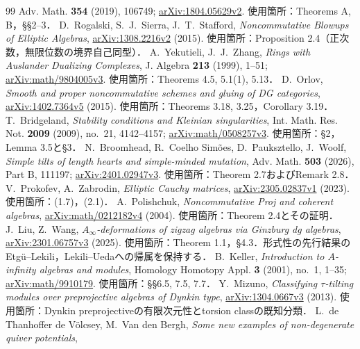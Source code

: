 \documentclass[11pt,a4paper]{ltjsarticle}
\theoremstyle{definition}
\begin{document}
\begin{thebibliography}{99}
Adv. Math. \textbf{354} (2019), 106749;
\href{https://arxiv.org/abs/1804.05629}{arXiv:1804.05629v2}.
使用箇所：Theorems A, B，\S\S2--3．
D.~Rogalski, S.~J.~Sierra, J.~T.~Stafford, \emph{Noncommutative Blowups of Elliptic Algebras},
\href{https://arxiv.org/abs/1308.2216}{arXiv:1308.2216v2} (2015).
使用箇所：Proposition 2.4（正次数，無限位数の境界自己同型）．
A.~Yekutieli, J.~J.~Zhang, \emph{Rings with Auslander Dualizing Complexes},
J. Algebra \textbf{213} (1999), 1--51;
\href{https://arxiv.org/abs/math/9804005}{arXiv:math/9804005v3}.
使用箇所：Theorems 4.5, 5.1(1), 5.13．
D.~Orlov, \emph{Smooth and proper noncommutative schemes and gluing of DG categories},
\href{https://arxiv.org/abs/1402.7364}{arXiv:1402.7364v5} (2015).
使用箇所：Theorems 3.18, 3.25，Corollary 3.19．
T.~Bridgeland, \emph{Stability conditions and Kleinian singularities},
Int. Math. Res. Not. \textbf{2009} (2009), no.~21, 4142--4157;
\href{https://arxiv.org/abs/math/0508257}{arXiv:math/0508257v3}.
使用箇所：\S2，Lemma 3.5と\S3．
N.~Broomhead, R.~Coelho Sim\~oes, D.~Pauksztello, J.~Woolf,
\emph{Simple tilts of length hearts and simple-minded mutation},
Adv. Math. \textbf{503} (2026), Part B, 111197;
\href{https://arxiv.org/abs/2401.02947}{arXiv:2401.02947v3}.
使用箇所：Theorem 2.7およびRemark 2.8．
V.~Prokofev, A.~Zabrodin, \emph{Elliptic Cauchy matrices},
\href{https://arxiv.org/abs/2305.02837}{arXiv:2305.02837v1} (2023).
使用箇所：(1.7)，(2.1)．
A.~Polishchuk, \emph{Noncommutative Proj and coherent algebras},
\href{https://arxiv.org/abs/math/0212182}{arXiv:math/0212182v4} (2004).
使用箇所：Theorem 2.4とその証明．
J.~Liu, Z.~Wang, \emph{$A_\infty$-deformations of zigzag algebras via Ginzburg dg algebras},
\href{https://arxiv.org/abs/2301.06757v3}{arXiv:2301.06757v3} (2025).
使用箇所：Theorem 1.1，\S4.3．形式性の先行結果のEtg\"u--Lekili，Lekili--Uedaへの帰属を保持する．
B.~Keller, \emph{Introduction to $A$-infinity algebras and modules},
Homology Homotopy Appl. \textbf{3} (2001), no.~1, 1--35;
\href{https://arxiv.org/abs/math/9910179}{arXiv:math/9910179}.
使用箇所：\S\S6.5, 7.5, 7.7．
Y.~Mizuno, \emph{Classifying $\tau$-tilting modules over preprojective algebras of Dynkin type},
\href{https://arxiv.org/abs/1304.0667v3}{arXiv:1304.0667v3} (2013).
使用箇所：Dynkin preprojectiveの有限次元性とtorsion classの既知分類．
L.~de Thanhoffer de V\"olcsey, M.~Van den Bergh, \emph{Some new examples of non-degenerate quiver potentials},

\end{thebibliography}
\end{document}
